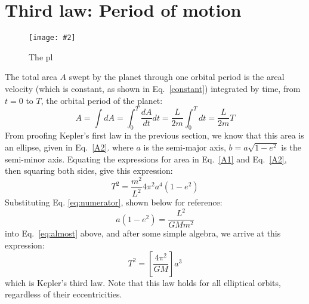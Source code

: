 \documentclass[11pt]{article}
\newcommand{\pic}[2]{
  \texttt{[image: \#2]}
}
\begin{document}
\section{Third law: Period of motion}
\begin{figure}
  \centering
  \pic{.5}{../kep8.png}
  \caption{The pl}
  \label{3rdlaw}
\end{figure}
The total area $A$ swept by the planet through one orbital period is the areal
velocity (which is constant, as shown in Eq.\ \ref{constant}) integrated by
time, from $t=0$ to $T$, the orbital period of the planet:
\begin{equation}
  A=\int dA=\int_0^T\frac{dA}{dt}dt=\frac{L}{2m}\int_0^Tdt=\frac{L}{2m}T
  \label{A1}
\end{equation}
From proofing Kepler's first law in the previous section, we know that this
area is an ellipse, given in Eq.~\ref{A2}.
where $a$ is the semi-major axis, $b=a\sqrt{1-e^2}$ is the semi-minor axis.
Equating the expressions for area in Eq.\ \ref{A1} and Eq.\ \ref{A2}, then
squaring both sides, give this expression:
\begin{equation}
  T^2=\frac{m^2}{L^2}4\pi^2a^4(1-e^2)
  \label{eq:almost}
\end{equation}
Substituting Eq. \ref{eq:numerator}, shown below for reference:
\begin{displaymath}
  a(1-e^2)=\frac{L^2}{GMm^2}
\end{displaymath}
into Eq.\ \ref{eq:almost} above, and after some simple algebra, we arrive at
this expression:
\begin{equation}
  \boxed{T^2=\left[\frac{4\pi^2}{GM}\right] a^3}
\end{equation}
which is Kepler's third law. Note that this law holds for all elliptical
orbits, regardless of their eccentricities.
\end{document}
